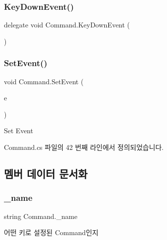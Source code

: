 \subsubsection{\texorpdfstring{KeyDownEvent()}{KeyDownEvent()}}
{\footnotesize\ttfamily delegate void Command.\+Key\+Down\+Event (\begin{DoxyParamCaption}{ }\end{DoxyParamCaption})}

\mbox{\label{class_command_a306ef92268d70413bf59adaa36a35b07}} 
\subsubsection{\texorpdfstring{SetEvent()}{SetEvent()}}
{\footnotesize\ttfamily void Command.\+Set\+Event (\begin{DoxyParamCaption}\item[{\mbox{\hyperlink{class_command_acc714b5e0de57b7f24b2619fff860b9d}{Key\+Down\+Event}}}]{e }\end{DoxyParamCaption})}



Set Event 



Command.\+cs 파일의 42 번째 라인에서 정의되었습니다.


\begin{DoxyCode}{0}

\end{DoxyCode}


\subsection{멤버 데이터 문서화}
\mbox{\label{class_command_a18a8a95d7f2c65bfa786fb525c42d0c4}} 
\subsubsection{\texorpdfstring{\_name}{\_name}}
{\footnotesize\ttfamily string Command.\+\_\+name}



어떤 키로 설정된 Command인지 




